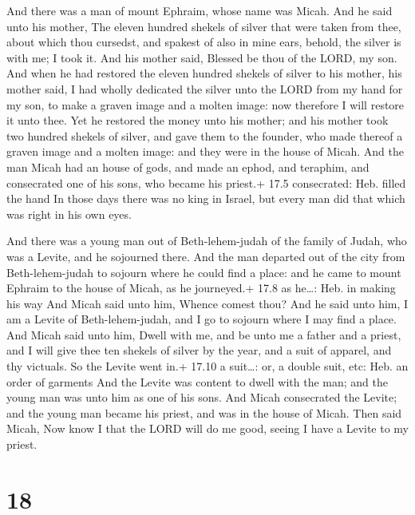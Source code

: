  And there was a man of mount Ephraim, whose name was Micah.
 And he said unto his mother, The eleven hundred shekels of
silver that were taken from thee, about which thou cursedst, and spakest
of also in mine ears, behold, the silver is with me; I took it. And his
mother said, Blessed be thou of the LORD, my son.  And when
he had restored the eleven hundred shekels of silver to his mother, his
mother said, I had wholly dedicated the silver unto the LORD from my
hand for my son, to make a graven image and a molten image: now
therefore I will restore it unto thee.  Yet he restored the
money unto his mother; and his mother took two hundred shekels of
silver, and gave them to the founder, who made thereof a graven image
and a molten image: and they were in the house of Micah. 
And the man Micah had an house of gods, and made an ephod, and teraphim,
and consecrated one of his sons, who became his priest.+ 17.5
consecrated: Heb. filled the hand  In those days there was
no king in Israel, but every man did that which was right in his own
eyes.

 And there was a young man out of Beth-lehem-judah of the
family of Judah, who was a Levite, and he sojourned there. 
And the man departed out of the city from Beth-lehem-judah to sojourn
where he could find a place: and he came to mount Ephraim to the house
of Micah, as he journeyed.+ 17.8 as he\ldots: Heb. in making his way
 And Micah said unto him, Whence comest thou? And he said
unto him, I am a Levite of Beth-lehem-judah, and I go to sojourn where I
may find a place.  And Micah said unto him, Dwell with me,
and be unto me a father and a priest, and I will give thee ten shekels
of silver by the year, and a suit of apparel, and thy victuals. So the
Levite went in.+ 17.10 a suit\ldots: or, a double suit, etc: Heb. an
order of garments  And the Levite was content to dwell with
the man; and the young man was unto him as one of his sons.
 And Micah consecrated the Levite; and the young man became
his priest, and was in the house of Micah.  Then said
Micah, Now know I that the LORD will do me good, seeing I have a Levite
to my priest.

\hypertarget{section-17}{%
\section{18}\label{section-17}}

